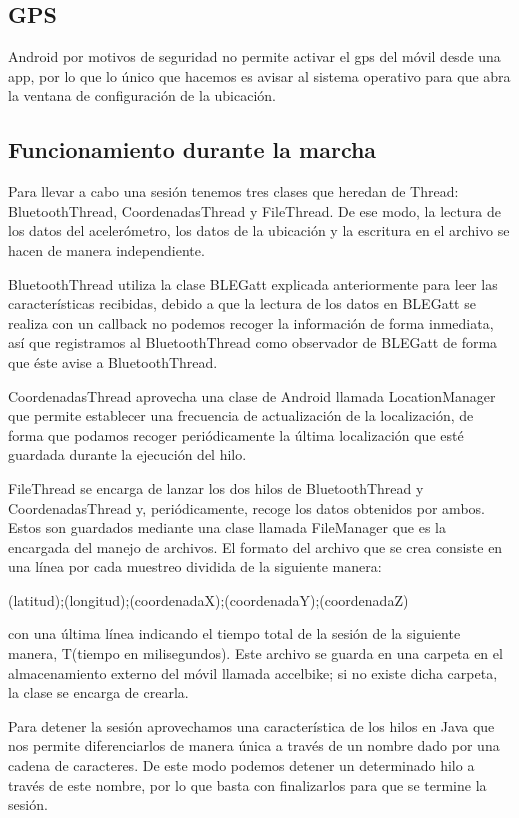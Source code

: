 \subsection{GPS}
\label{makereference6.2.2}

Android por motivos de seguridad no permite activar el gps del móvil desde una app, por lo que lo único que hacemos es avisar al sistema operativo para que abra la ventana de configuración de la ubicación. 

\subsection{Funcionamiento durante la marcha}
\label{makereference6.2.3}

Para llevar a cabo una sesión tenemos tres clases que heredan de Thread: BluetoothThread, CoordenadasThread y FileThread. De ese modo, la lectura de los datos del acelerómetro, los datos de la ubicación y la escritura en el archivo se hacen de manera independiente. 

BluetoothThread utiliza la clase BLEGatt explicada anteriormente para leer las características recibidas, debido a que la lectura de los datos en BLEGatt se realiza con un callback no podemos recoger la información de forma inmediata, así que registramos al BluetoothThread como observador de BLEGatt de forma que éste avise a BluetoothThread.

CoordenadasThread aprovecha una clase de Android llamada LocationManager que permite establecer una frecuencia de actualización de la localización, de forma que podamos recoger periódicamente la última localización que esté guardada durante la ejecución del hilo.

FileThread se encarga de lanzar los dos hilos de BluetoothThread y CoordenadasThread y, periódicamente, recoge los datos obtenidos por ambos. Estos son guardados mediante una clase llamada FileManager que es la encargada del manejo de archivos. El formato del archivo que se crea consiste en una línea por cada muestreo dividida de la siguiente manera:

(latitud);(longitud);(coordenadaX);(coordenadaY);(coordenadaZ)

 con una última línea indicando el tiempo total de la sesión de la siguiente manera, T(tiempo en milisegundos). Este archivo se guarda en una carpeta en el almacenamiento externo del móvil llamada accelbike; si no existe dicha carpeta, la clase se encarga de crearla.

Para detener la sesión aprovechamos una característica de los hilos en Java que nos permite diferenciarlos de manera única a través de un nombre dado por una cadena de caracteres. De este modo podemos detener un determinado hilo a través de este nombre, por lo que basta con finalizarlos para que se termine la sesión.

